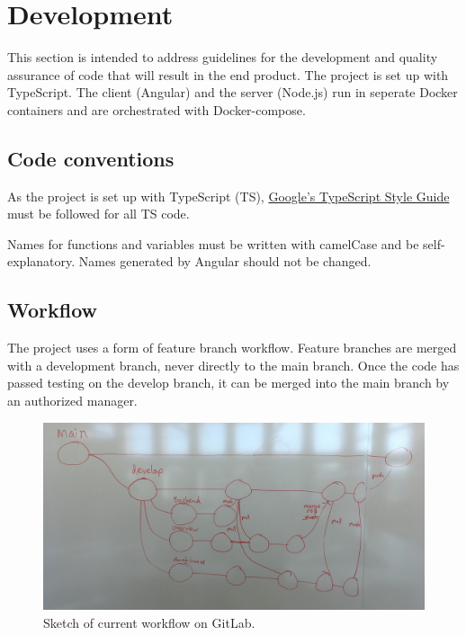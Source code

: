 \section{Development}
This section is intended to address guidelines for the development and quality assurance of code that will result in the end product. The project is set up with TypeScript. The client (Angular) and the server (Node.js) run in seperate Docker containers and are orchestrated with Docker-compose.

\subsection{Code conventions}
As the project is set up with TypeScript (TS), \href{https://google.github.io/styleguide/tsguide.html}{Google's TypeScript Style Guide} must be followed for all TS code.

Names for functions and variables must be written with camelCase and be self-explanatory. Names generated by Angular should not be changed.

\subsection{Workflow}
The project uses a form of feature branch workflow. Feature branches are merged with a development branch, never directly to the main branch. Once the code has passed testing on the develop branch, it can be merged into the main branch by an authorized manager.

\begin{figure}[H]
    \centering\includegraphics[width=1\linewidth]{figures/workflow-sketch.jpg}
    \caption{Sketch of current workflow on GitLab.}
    \label{fig:workflow}
\end{figure}

